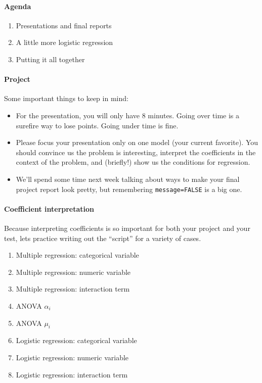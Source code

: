 \documentclass[10pt]{article}\usepackage[]{graphicx}\usepackage[]{color}
\begin{document}
\paragraph{Agenda}
\begin{enumerate}
  \itemsep0em
  \item Presentations and final reports
  \item A little more logistic regression
  \item Putting it all together
\end{enumerate}



\paragraph{Project} 
Some important things to keep in mind:
\begin{itemize}
\item For the presentation, you will only have 8 minutes. Going over time is a surefire way to lose points. Going under time is fine.
\item Please focus your presentation only on one model (your current favorite). You should convince us the problem is interesting, interpret the coefficients in the context of the problem, and (briefly!) show us the conditions for regression. 
\item We'll spend some time next week talking about ways to make your final project report look pretty, but remembering \verb#message=FALSE# is a big one. 
\end{itemize}

\paragraph{Coefficient interpretation} Because interpreting coefficients is so important for both your project and your test, lets practice writing out the ``script'' for a variety of cases. 

\begin{enumerate}
\itemsep0.5in
\item Multiple regression: categorical variable
\item Multiple regression: numeric variable
\item Multiple regression: interaction term
\item ANOVA $\alpha_i$
\item ANOVA $\mu_i$
\item Logistic regression: categorical variable
\item Logistic regression: numeric variable
\item Logistic regression: interaction term
\end{enumerate}
\end{document}
